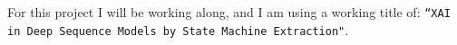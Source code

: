 For this project I will be working along, and I am using a working title of:
\texttt{``XAI in Deep Sequence Models by State Machine Extraction"}.